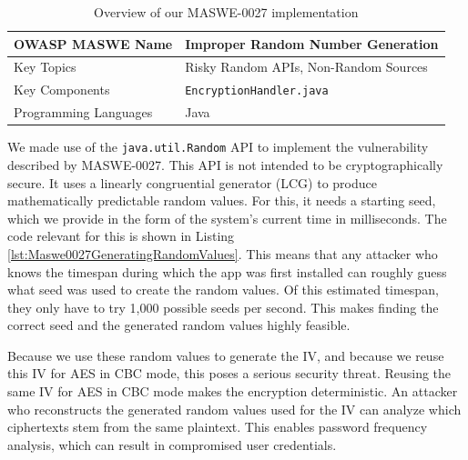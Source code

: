 \vspace{-65pt}

\begin{table}[H]
    \centering
    \renewcommand{\arraystretch}{1.3}
        \begin{tabular}{p{5cm} p{8cm}} 
        \toprule
        OWASP MASWE Name & Improper Random Number Generation \\ 
        \midrule
        Key Topics & Risky Random APIs, Non-Random Sources \\
        Key Components & \texttt{EncryptionHandler.java} \\
        Programming Languages & Java \\ 
        \bottomrule
        \end{tabular}
    \caption{Overview of our MASWE-0027 implementation}
    \label{tab:maswe-0027}
\end{table}

\vspace{-60pt}

We made use of the \texttt{java.util.Random} API \cite{java_util_random} to implement the vulnerability described by MASWE-0027. This API is not intended to be cryptographically secure. It uses a linearly congruential generator (LCG) to produce mathematically predictable random values. For this, it needs a starting seed, which we provide in the form of the system's current time in milliseconds. The code relevant for this is shown in Listing \ref{lst:Maswe0027GeneratingRandomValues}. This means that any attacker who knows the timespan during which the app was first installed can roughly guess what seed was used to create the random values. Of this estimated timespan, they only have to try 1,000 possible seeds per second. This makes finding the correct seed and the generated random values highly feasible.

Because we use these random values to generate the IV, and because we reuse this IV for AES in CBC mode, this poses a serious security threat. Reusing the same IV for AES in CBC mode makes the encryption deterministic. An attacker who reconstructs the generated random values used for the IV can analyze which ciphertexts stem from the same plaintext. This enables password frequency analysis, which can result in compromised user credentials.

